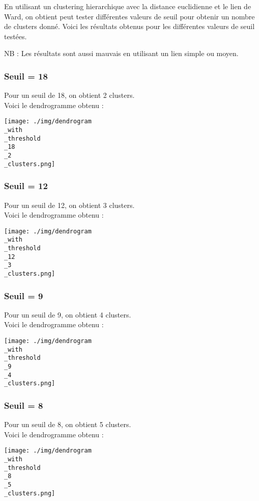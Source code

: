\documentclass{article}
\begin{document}
En utilisant un clustering hierarchique avec la distance euclidienne et 
le lien de Ward, on obtient peut tester différentes valeurs de seuil pour
obtenir un nombre de clusters donné. Voici les résultats obtenus pour les
différentes valeurs de seuil testées.

NB : Les résultats sont aussi mauvais en utilisant un lien simple ou
moyen.

\subsubsection*{Seuil = 18}
Pour un seuil de 18, on obtient 2 clusters.\\
Voici le dendrogramme obtenu :

\begin{center}
    \texttt{[image: ./img/dendrogram\\\_with\\\_threshold\\\_18\\\_2\\\_clusters.png]}
\end{center}

\subsubsection*{Seuil = 12}
Pour un seuil de 12, on obtient 3 clusters.\\
Voici le dendrogramme obtenu :

\begin{center}
    \texttt{[image: ./img/dendrogram\\\_with\\\_threshold\\\_12\\\_3\\\_clusters.png]}
\end{center}

\subsubsection*{Seuil = 9}
Pour un seuil de 9, on obtient 4 clusters.\\
Voici le dendrogramme obtenu :

\begin{center}
    \texttt{[image: ./img/dendrogram\\\_with\\\_threshold\\\_9\\\_4\\\_clusters.png]}
\end{center}

\subsubsection*{Seuil = 8}
Pour un seuil de 8, on obtient 5 clusters.\\
Voici le dendrogramme obtenu :

\begin{center}
    \texttt{[image: ./img/dendrogram\\\_with\\\_threshold\\\_8\\\_5\\\_clusters.png]}
\end{center}
\end{document}
